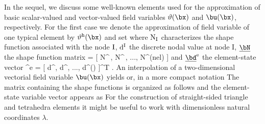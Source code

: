 In the sequel, we discuss some well-known elements used 
for the approximation of basic scalar-valued 
and vector-valued field variables $\rm \vartheta(\bx)$ 
and $\rm \bu(\bx)$, respectively. 
For the first case we denote the approximation of 
field variable of one typical element by 
$\rm \vartheta^h(\bx)$ and set
%
\ee
%
where $\rm N_I$ characterizes the shape function 
associated with the node $\rm I$, $\rm d^I$ the discrete 
nodal value at node I, $\rm \underline\bN$ the shape 
function matrix
\eb\rm
\underline{\INN} = [ N^{\,}, N^{\,}, ..., N^{\rm (nel)} ]
\ee
and $\rm \underline\bd^e $ the element-state vector
\eb\rm
\matbd^e =  [ d^{}, d^{}, ..., d^{(\nel)} ]^T .
\ee
%
An interpolation of a two-dimensional vectorial 
field variable $\rm \bu(\bx)$ yields
%
\ee
%
or, in a more compact notation
%
\ee
%
The matrix containing the shape functions is organized 
as follows 
%
\ee
%
and the  element-state variable vector appears as 
\ee
%
For the construction of straight-sided triangle and tetrahedra elements
it might be useful to work with dimensionless natural coordinates $\lambda$.
